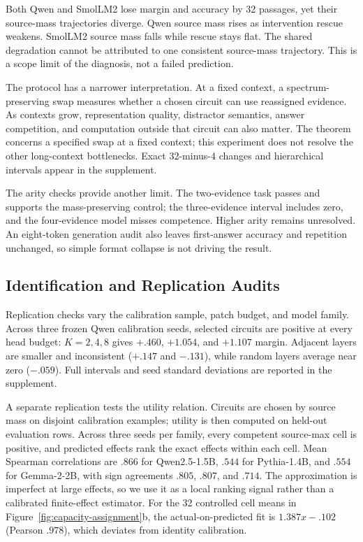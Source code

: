 \documentclass[letterpaper]{article} %
\begin{document}
Both Qwen and SmolLM2 lose margin and accuracy by 32 passages, yet their source-mass trajectories diverge.
Qwen source mass rises as intervention rescue weakens. SmolLM2 source mass falls while rescue stays flat.
The shared degradation cannot be attributed to one consistent source-mass trajectory. This is a scope limit of
the diagnosis, not a failed prediction.

The protocol has a narrower interpretation. At a fixed context, a spectrum-preserving swap measures whether a
chosen circuit can use reassigned evidence. As contexts grow, representation quality, distractor semantics,
answer competition, and computation outside that circuit can also matter. The theorem concerns a specified
swap at a fixed context; this experiment does not resolve the other long-context bottlenecks. Exact 32-minus-4
changes and hierarchical intervals appear in the supplement.

The arity checks provide another limit. The two-evidence task
passes and supports the mass-preserving control; the three-evidence interval includes zero, and the
four-evidence model misses competence. Higher arity remains unresolved. An eight-token generation audit also
leaves first-answer accuracy and repetition unchanged, so simple format collapse is not driving the result.

\subsection{Identification and Replication Audits}

Replication checks vary the calibration sample, patch budget, and model family. Across three frozen Qwen
calibration seeds, selected circuits are positive at every head budget: $K=2,4,8$ gives
$+.460$, $+1.054$, and $+1.107$ margin. Adjacent layers are smaller and inconsistent ($+.147$ and
$-.131$), while random layers average near zero ($-.059$). Full intervals and seed standard deviations are
reported in the supplement.

A separate replication tests the utility relation. Circuits are chosen by source mass on
disjoint calibration examples; utility is then computed on held-out evaluation rows. Across three seeds per
family, every competent source-max cell is positive, and predicted effects rank the exact effects within each
cell. Mean Spearman correlations are $.866$ for Qwen2.5-1.5B, $.544$ for Pythia-1.4B, and $.554$ for
Gemma-2-2B, with sign agreements $.805$, $.807$, and $.714$. The approximation is imperfect at large effects,
so we use it as a local ranking signal rather than a calibrated finite-effect estimator. For the 32 controlled cell means in
Figure~\ref{fig:capacity-assignment}b, the actual-on-predicted fit is $1.387x-.102$ (Pearson $.978$), which
deviates from identity calibration.
\end{document}
